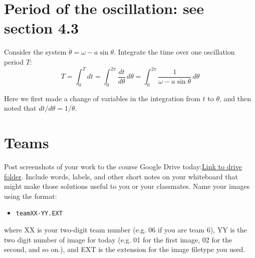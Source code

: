 \documentclass[12pt]{amsart}
\theoremstyle{conjecture}
\theoremstyle{definition}
\theoremstyle{question}
\theoremstyle{theorem}
\begin{document}
    \section*{Period of the oscillation: see section 4.3}
    \hspace*{1.5em}Consider the system $\dot\theta=\omega-a\sin\theta$. Integrate the time over one oscillation period $T$:
    \[
        T=\int_0^T dt
        =\int_0^{2\pi}\frac{dt}{d\theta}\,d\theta
        =\int_0^{2\pi}\frac{1}{\omega-a\sin\theta}\,d\theta
    \]

    \hspace*{1.5em}Here we first made a change of variables in the integration from $t$ to $\theta$, and then noted that
    $dt/d\theta=1/\dot\theta$.

    \section*{}
    \newpage

    \section*{Teams}
    Post screenshots of your work to the course Google Drive today:\href{https://drive.google.com/}{Link to drive folder}.
    Include words, labels, and other short notes on your whiteboard that might make those solutions useful
    to you or your classmates. Name your images using the format:

    \begin{itemize}
        \item \texttt{teamXX-YY.EXT}
    \end{itemize}

    where XX is your two-digit team number (e.g. 06 if you are team 6), YY is the two digit number of image
    for today (e.g. 01 for the first image, 02 for the second, and so on.), and EXT is the extension for the
    image filetype you used.
\end{document}
